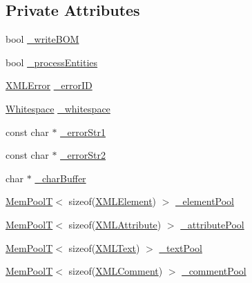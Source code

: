 \subsection*{Private Attributes}
\begin{DoxyCompactItemize}
\item 
bool \hyperlink{classtinyxml2_1_1_x_m_l_document_a1dbdc7feaa58007403c20243ac5abbd3}{\-\_\-write\-B\-O\-M}
\item 
bool \hyperlink{classtinyxml2_1_1_x_m_l_document_a9f768cb74fb5ccbadeffa436916f0194}{\-\_\-process\-Entities}
\item 
\hyperlink{namespacetinyxml2_a1fbf88509c3ac88c09117b1947414e08}{X\-M\-L\-Error} \hyperlink{classtinyxml2_1_1_x_m_l_document_a61270d643f810975656da2054e1e1622}{\-\_\-error\-I\-D}
\item 
\hyperlink{namespacetinyxml2_a7f91d00f77360f850fd5da0861e27dd5}{Whitespace} \hyperlink{classtinyxml2_1_1_x_m_l_document_a5342ed1e7dc1fe6afc81d4740c465320}{\-\_\-whitespace}
\item 
const char $\ast$ \hyperlink{classtinyxml2_1_1_x_m_l_document_a40948cedd3c1a0b19af0d483651e6aa8}{\-\_\-error\-Str1}
\item 
const char $\ast$ \hyperlink{classtinyxml2_1_1_x_m_l_document_a6627d1da446d48eefb03a86850e9bf6d}{\-\_\-error\-Str2}
\item 
char $\ast$ \hyperlink{classtinyxml2_1_1_x_m_l_document_a7913ff24220a40e2e2b49a5137b43d29}{\-\_\-char\-Buffer}
\item 
\hyperlink{classtinyxml2_1_1_mem_pool_t}{Mem\-Pool\-T}$<$ sizeof(\hyperlink{classtinyxml2_1_1_x_m_l_element}{X\-M\-L\-Element}) $>$ \hyperlink{classtinyxml2_1_1_x_m_l_document_a21574fba363a0d23bfc820d1652ab8bc}{\-\_\-element\-Pool}
\item 
\hyperlink{classtinyxml2_1_1_mem_pool_t}{Mem\-Pool\-T}$<$ sizeof(\hyperlink{classtinyxml2_1_1_x_m_l_attribute}{X\-M\-L\-Attribute}) $>$ \hyperlink{classtinyxml2_1_1_x_m_l_document_a0a57ebeba23bc6cfce88f12b4a946aac}{\-\_\-attribute\-Pool}
\item 
\hyperlink{classtinyxml2_1_1_mem_pool_t}{Mem\-Pool\-T}$<$ sizeof(\hyperlink{classtinyxml2_1_1_x_m_l_text}{X\-M\-L\-Text}) $>$ \hyperlink{classtinyxml2_1_1_x_m_l_document_afe8ac410aaa53cf1f2142a4c2fd958c7}{\-\_\-text\-Pool}
\item 
\hyperlink{classtinyxml2_1_1_mem_pool_t}{Mem\-Pool\-T}$<$ sizeof(\hyperlink{classtinyxml2_1_1_x_m_l_comment}{X\-M\-L\-Comment}) $>$ \hyperlink{classtinyxml2_1_1_x_m_l_document_ac2e73ccbc037dee917c3163158180398}{\-\_\-comment\-Pool}
\end{DoxyCompactItemize}
